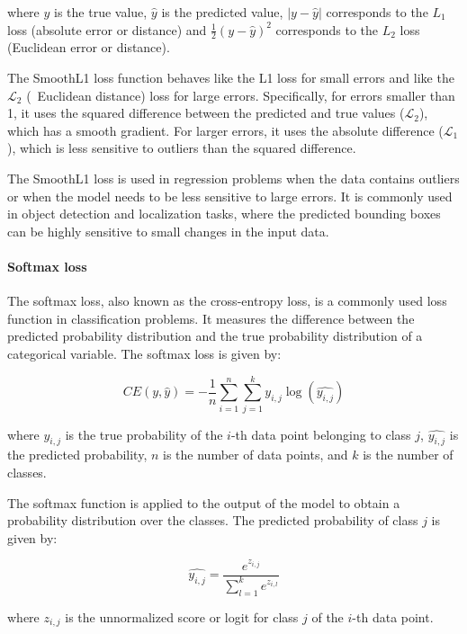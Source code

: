 where $y$ is the true value, $\hat{y}$ is the predicted value, $|y - \hat{y}|$ corresponds to the $L_1$ loss (absolute error or distance) and $\frac{1}{2}(y - \hat{y})^2$ corresponds to the $L_2$ loss (Euclidean error or distance).

The SmoothL1 loss function behaves like the L1 loss for small errors and like the $\mathcal{L}_2$ (\aka \ Euclidean distance) loss for large errors. Specifically, for errors smaller than 1, it uses the squared difference between the predicted and true values ($\mathcal{L}_2$), which has a smooth gradient. For larger errors, it uses the absolute difference ($\mathcal{L}_1$), which is less sensitive to outliers than the squared difference.

The SmoothL1 loss is used in regression problems when the data contains outliers or when the model needs to be less sensitive to large errors. It is commonly used in object detection and localization tasks, where the predicted bounding boxes can be highly sensitive to small changes in the input data.

\paragraph{Softmax loss}
\label{par:3_softmax_loss}

The softmax loss, also known as the cross-entropy loss, is a commonly used loss function in classification problems. It measures the difference between the predicted probability distribution and the true probability distribution of a categorical variable. The softmax loss is given by:

\begin{equation}
	CE(y, \hat{y}) = -\frac{1}{n}\sum_{i=1}^{n}\sum_{j=1}^{k} y_{i,j}\log(\hat{y_{i,j}})
\end{equation}

where $y_{i,j}$ is the true probability of the $i$-th data point belonging to class $j$, $\hat{y_{i,j}}$ is the predicted probability, $n$ is the number of data points, and $k$ is the number of classes.

The softmax function is applied to the output of the model to obtain a probability distribution over the classes. The predicted probability of class $j$ is given by:

\begin{equation}
	\hat{y_{i,j}} = \frac{e^{z_{i,j}}}{\sum_{l=1}^{k} e^{z_{i,l}}}
\end{equation}

where $z_{i,j}$ is the unnormalized score or logit for class $j$ of the $i$-th data point.

